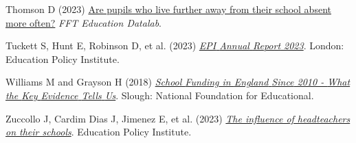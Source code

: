 \documentclass[
  11pt,
]{article}
\newlength{\cslhangindent}
\newenvironment{CSLReferences}[2] %
 {\begin{list}{}{%
  \setlength{\itemindent}{0pt}
  \setlength{\leftmargin}{0pt}
  \setlength{\parsep}{0pt}
  \ifodd #1
   \setlength{\leftmargin}{\cslhangindent}
   \setlength{\itemindent}{-1\cslhangindent}
  \fi
  \setlength{\itemsep}{#2\baselineskip}}}
 {\end{list}}
\begin{document}
\begin{CSLReferences}{1}{1}
Thomson D (2023)
\href{https://ffteducationdatalab.org.uk/2023/11/are-pupils-who-live-further-away-from-their-school-absent-more-often/}{Are
pupils who live further away from their school absent more often?}
\emph{FFT Education Datalab}.

Tuckett S, Hunt E, Robinson D, et al. (2023)
\emph{\href{https://epi.org.uk/annual-report-2023/}{{EPI} {Annual}
{Report} 2023}}. London: Education Policy Institute.

Williams M and Grayson H (2018)
\emph{\href{https://www.nfer.ac.uk/publications/school-funding-in-england-since-2010-what-the-key-evidence-tells-us/}{School
{Funding} in {England} {Since} 2010 - {What} the {Key} {Evidence}
{Tells} {Us}}}. Slough: National Foundation for Educational.

Zuccollo J, Cardim Dias J, Jimenez E, et al. (2023)
\emph{\href{https://epi.org.uk/publications-and-research/the-influence-of-headteachers-on-their-schools/}{The
influence of headteachers on their schools}}. Education Policy
Institute.

\end{CSLReferences}

\section*{}\label{section}

\label{footnotes-section}
\end{document}
